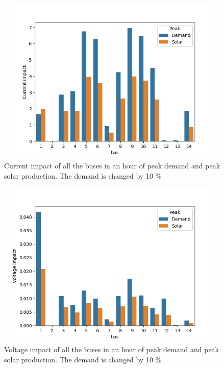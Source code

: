 \documentclass[class=book, crop=false]{standalone}
\begin{document}
\begin{figure}[h]
    \center
\includegraphics[height=8cm, width=12cm]{figures/current_impact_demand_solar.png}
    \caption[size = 9]{Current impact of all the buses in an hour of peak demand and peak solar production. The demand is changed by 10 \%}
    \label{fig:discussion:current_impact_demand_solar}
\end{figure}

\begin{figure}[h]
    \center
\includegraphics[height=8cm, width=12cm]{figures/voltage_impact_demand_solar.png}
    \caption[size = 9]{Voltage impact of all the buses in an hour of peak demand and peak solar production. The demand is changed by 10 \%}
    \label{fig:discussion:voltage_impact_demand_solar}
\end{figure}
\end{document}
